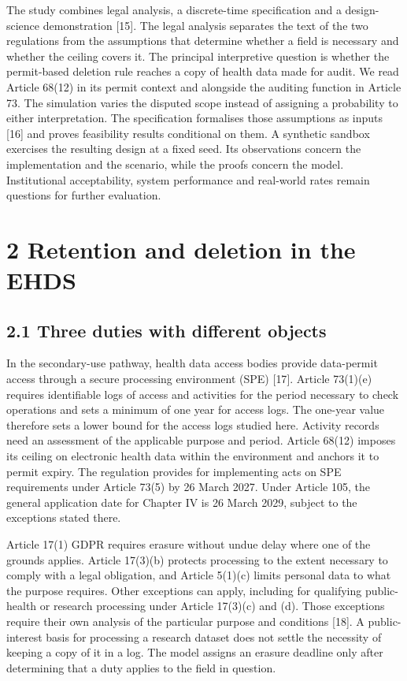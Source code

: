 \documentclass[preprint,review,12pt]{elsarticle}
\begin{document}
The study combines legal analysis, a discrete-time specification and a
design-science demonstration {[}15{]}. The legal analysis separates the
text of the two regulations from the assumptions that determine whether
a field is necessary and whether the ceiling covers it. The principal
interpretive question is whether the permit-based deletion rule reaches
a copy of health data made for audit. We read Article 68(12) in its
permit context and alongside the auditing function in Article 73. The
simulation varies the disputed scope instead of assigning a probability
to either interpretation. The specification formalises those assumptions
as inputs {[}16{]} and proves feasibility results conditional on them. A
synthetic sandbox exercises the resulting design at a fixed seed. Its
observations concern the implementation and the scenario, while the
proofs concern the model. Institutional acceptability, system
performance and real-world rates remain questions for further
evaluation.

\hypertarget{retention-and-deletion-in-the-ehds}{%
\section{2 Retention and deletion in the
EHDS}\label{retention-and-deletion-in-the-ehds}}

\hypertarget{three-duties-with-different-objects}{%
\subsection{2.1 Three duties with different
objects}\label{three-duties-with-different-objects}}

In the secondary-use pathway, health data access bodies provide
data-permit access through a secure processing environment (SPE)
{[}17{]}. Article 73(1)(e) requires identifiable logs of access and
activities for the period necessary to check operations and sets a
minimum of one year for access logs. The one-year value therefore sets a
lower bound for the access logs studied here. Activity records need an
assessment of the applicable purpose and period. Article 68(12) imposes
its ceiling on electronic health data within the environment and anchors
it to permit expiry. The regulation provides for implementing acts on
SPE requirements under Article 73(5) by 26 March 2027. Under Article
105, the general application date for Chapter IV is 26 March 2029,
subject to the exceptions stated there.

Article 17(1) GDPR requires erasure without undue delay where one of the
grounds applies. Article 17(3)(b) protects processing to the extent
necessary to comply with a legal obligation, and Article 5(1)(c) limits
personal data to what the purpose requires. Other exceptions can apply,
including for qualifying public-health or research processing under
Article 17(3)(c) and (d). Those exceptions require their own analysis of
the particular purpose and conditions {[}18{]}. A public-interest basis
for processing a research dataset does not settle the necessity of
keeping a copy of it in a log. The model assigns an erasure deadline
only after determining that a duty applies to the field in question.
\end{document}

